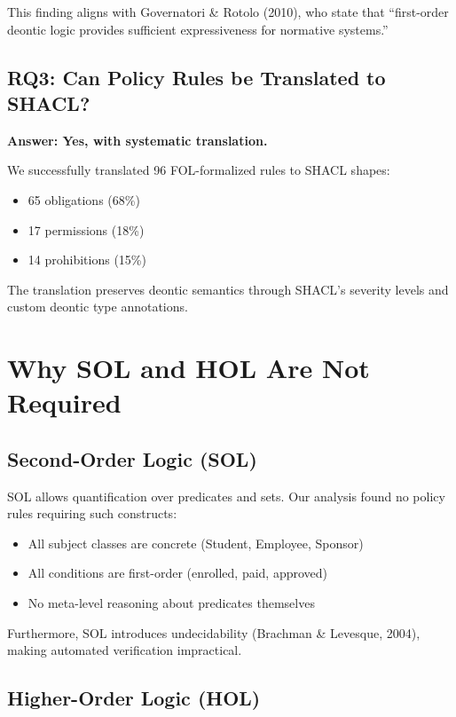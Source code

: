 This finding aligns with Governatori \& Rotolo (2010), who state that ``first-order deontic logic provides sufficient expressiveness for normative systems.''

\subsection{RQ3: Can Policy Rules be Translated to SHACL?}

\textbf{Answer: Yes, with systematic translation.}

We successfully translated 96 FOL-formalized rules to SHACL shapes:
\begin{itemize}
    \item 65 obligations (68\%)
    \item 17 permissions (18\%)
    \item 14 prohibitions (15\%)
\end{itemize}

The translation preserves deontic semantics through SHACL's severity levels and custom deontic type annotations.

\section{Why SOL and HOL Are Not Required}

\subsection{Second-Order Logic (SOL)}

SOL allows quantification over predicates and sets. Our analysis found no policy rules requiring such constructs:

\begin{itemize}
    \item All subject classes are concrete (Student, Employee, Sponsor)
    \item All conditions are first-order (enrolled, paid, approved)
    \item No meta-level reasoning about predicates themselves
\end{itemize}

Furthermore, SOL introduces undecidability (Brachman \& Levesque, 2004), making automated verification impractical.

\subsection{Higher-Order Logic (HOL)}

